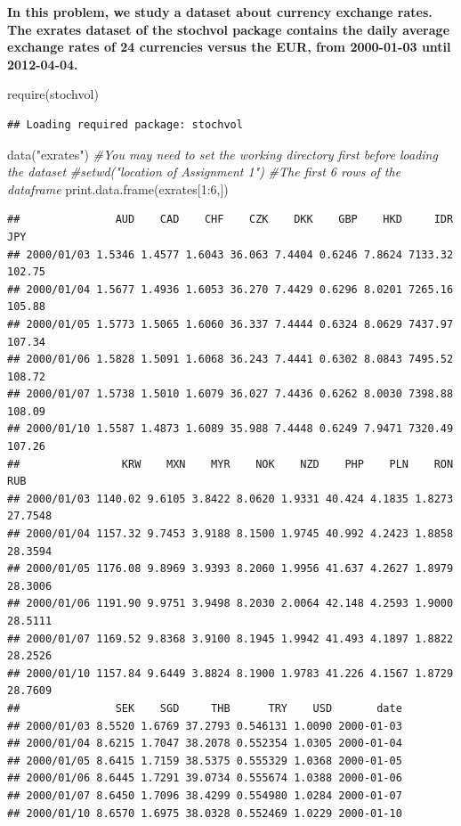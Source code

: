 \documentclass[
]{article}
\newenvironment{Shaded}{\begin{snugshade}}{\end{snugshade}}
\newcommand{\CommentTok}[1]{\textcolor[rgb]{0.56,0.35,0.01}{\textit{#1}}}
\newcommand{\DecValTok}[1]{\textcolor[rgb]{0.00,0.00,0.81}{#1}}
\newcommand{\FunctionTok}[1]{\textcolor[rgb]{0.00,0.00,0.00}{#1}}
\newcommand{\NormalTok}[1]{#1}
\newcommand{\SpecialCharTok}[1]{\textcolor[rgb]{0.00,0.00,0.00}{#1}}
\newcommand{\StringTok}[1]{\textcolor[rgb]{0.31,0.60,0.02}{#1}}
\begin{document}
\textbf{In this problem, we study a dataset about currency exchange
rates. The exrates dataset of the stochvol package contains the daily
average exchange rates of 24 currencies versus the EUR, from 2000-01-03
until 2012-04-04.}

\begin{Shaded}
\begin{Highlighting}[]
\FunctionTok{require}\NormalTok{(stochvol)}
\end{Highlighting}
\end{Shaded}

\begin{verbatim}
## Loading required package: stochvol
\end{verbatim}

\begin{Shaded}
\begin{Highlighting}[]
\FunctionTok{data}\NormalTok{(}\StringTok{"exrates"}\NormalTok{)}
\CommentTok{\#You may need to set the working directory first before loading the dataset}
\CommentTok{\#setwd("location of Assignment 1")}
\CommentTok{\#The first 6 rows of the dataframe}
\FunctionTok{print.data.frame}\NormalTok{(exrates[}\DecValTok{1}\SpecialCharTok{:}\DecValTok{6}\NormalTok{,])}
\end{Highlighting}
\end{Shaded}

\begin{verbatim}
##               AUD    CAD    CHF    CZK    DKK    GBP    HKD     IDR    JPY
## 2000/01/03 1.5346 1.4577 1.6043 36.063 7.4404 0.6246 7.8624 7133.32 102.75
## 2000/01/04 1.5677 1.4936 1.6053 36.270 7.4429 0.6296 8.0201 7265.16 105.88
## 2000/01/05 1.5773 1.5065 1.6060 36.337 7.4444 0.6324 8.0629 7437.97 107.34
## 2000/01/06 1.5828 1.5091 1.6068 36.243 7.4441 0.6302 8.0843 7495.52 108.72
## 2000/01/07 1.5738 1.5010 1.6079 36.027 7.4436 0.6262 8.0030 7398.88 108.09
## 2000/01/10 1.5587 1.4873 1.6089 35.988 7.4448 0.6249 7.9471 7320.49 107.26
##                KRW    MXN    MYR    NOK    NZD    PHP    PLN    RON     RUB
## 2000/01/03 1140.02 9.6105 3.8422 8.0620 1.9331 40.424 4.1835 1.8273 27.7548
## 2000/01/04 1157.32 9.7453 3.9188 8.1500 1.9745 40.992 4.2423 1.8858 28.3594
## 2000/01/05 1176.08 9.8969 3.9393 8.2060 1.9956 41.637 4.2627 1.8979 28.3006
## 2000/01/06 1191.90 9.9751 3.9498 8.2030 2.0064 42.148 4.2593 1.9000 28.5111
## 2000/01/07 1169.52 9.8368 3.9100 8.1945 1.9942 41.493 4.1897 1.8822 28.2526
## 2000/01/10 1157.84 9.6449 3.8824 8.1900 1.9783 41.226 4.1567 1.8729 28.7609
##               SEK    SGD     THB      TRY    USD       date
## 2000/01/03 8.5520 1.6769 37.2793 0.546131 1.0090 2000-01-03
## 2000/01/04 8.6215 1.7047 38.2078 0.552354 1.0305 2000-01-04
## 2000/01/05 8.6415 1.7159 38.5375 0.555329 1.0368 2000-01-05
## 2000/01/06 8.6445 1.7291 39.0734 0.555674 1.0388 2000-01-06
## 2000/01/07 8.6450 1.7096 38.4299 0.554980 1.0284 2000-01-07
## 2000/01/10 8.6570 1.6975 38.0328 0.552469 1.0229 2000-01-10
\end{verbatim}
\end{document}
